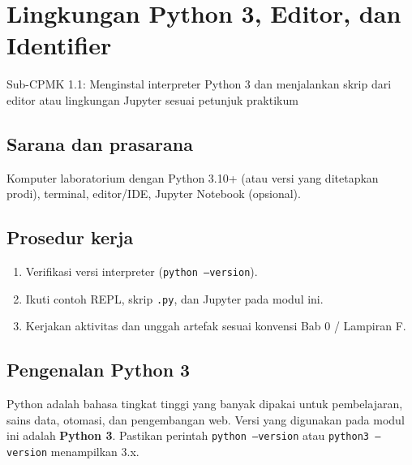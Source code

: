 \documentclass[../main.tex]{subfiles}
\begin{document}
\chapter{Lingkungan Python 3, Editor, dan Identifier}

\begin{subcpmk}
  \item Sub-CPMK 1.1: Menginstal interpreter Python 3 dan menjalankan skrip dari editor atau lingkungan Jupyter sesuai petunjuk praktikum
\end{subcpmk}


\section{Sarana dan prasarana}

Komputer laboratorium dengan Python 3.10+ (atau versi yang ditetapkan prodi), terminal, editor/IDE, Jupyter Notebook (opsional).

\section{Prosedur kerja}

\begin{enumerate}[leftmargin=*]
  \item Verifikasi versi interpreter (\texttt{python --version}).
  \item Ikuti contoh REPL, skrip \texttt{.py}, dan Jupyter pada modul ini.
  \item Kerjakan aktivitas dan unggah artefak sesuai konvensi Bab 0 / Lampiran F.
\end{enumerate}

\section{Pengenalan Python 3}

Python adalah bahasa tingkat tinggi yang banyak dipakai untuk pembelajaran, sains data, otomasi, dan pengembangan web. Versi yang digunakan pada modul ini adalah \textbf{Python 3}. Pastikan perintah \texttt{python --version} atau \texttt{python3 --version} menampilkan 3.x.
\end{document}
